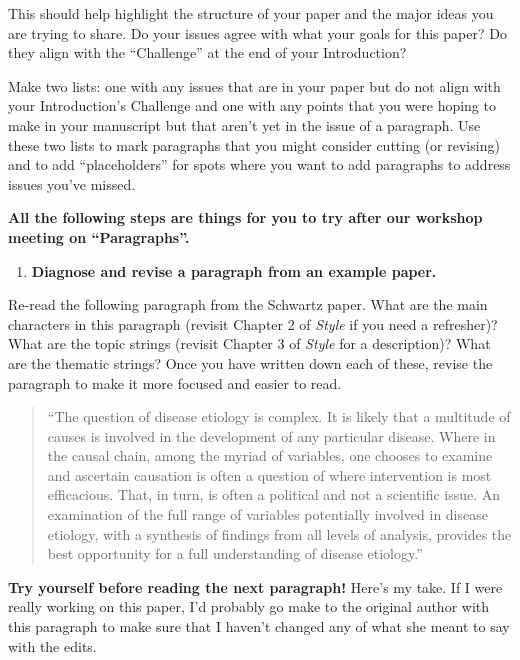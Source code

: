 \documentclass[]{tufte-book}
\providecommand{\tightlist}{%
  \setlength{\itemsep}{0pt}\setlength{\parskip}{0pt}}
\begin{document}
This should help highlight the structure of your paper and the major ideas you
are trying to share. Do your issues agree with what your goals for this paper?
Do they align with the ``Challenge'' at the end of your Introduction?

Make two lists: one with any issues that are in your paper but do not align with
your Introduction's Challenge and one with any points that you were hoping to
make in your manuscript but that aren't yet in the issue of a paragraph. Use
these two lists to mark paragraphs that you might consider cutting (or revising)
and to add ``placeholders'' for spots where you want to add paragraphs to address
issues you've missed.

\textbf{All the following steps are things for you to try after our workshop
meeting on ``Paragraphs''.}

\begin{enumerate}
\def\labelenumi{\arabic{enumi}.}
\setcounter{enumi}{6}
\tightlist
\item
  \textbf{Diagnose and revise a paragraph from an example paper.}
\end{enumerate}

Re-read the following paragraph from the Schwartz paper. What are the main characters
in this paragraph (revisit Chapter 2 of \emph{Style} if you need a refresher)? What are
the topic strings (revisit Chapter 3 of \emph{Style} for a description)? What
are the thematic strings? Once you have written down each of these, revise
the paragraph to make it more focused and easier to read.

\begin{quote}
``The question of disease etiology is complex. It is likely that a multitude of
causes is involved in the development of any particular disease. Where in the
causal chain, among the myriad of variables, one chooses to examine and
ascertain causation is often a question of where intervention is most
efficacious. That, in turn, is often a political and not a scientific issue. An
examination of the full range of variables potentially involved in disease
etiology, with a synthesis of findings from all levels of analysis, provides the
best opportunity for a full understanding of disease etiology.''
\end{quote}

\textbf{Try yourself before reading the next paragraph!} Here's my take. If I were
really working on this paper, I'd probably go make to the original author
with this paragraph to make sure that I haven't changed any of what she meant
to say with the edits.
\end{document}
